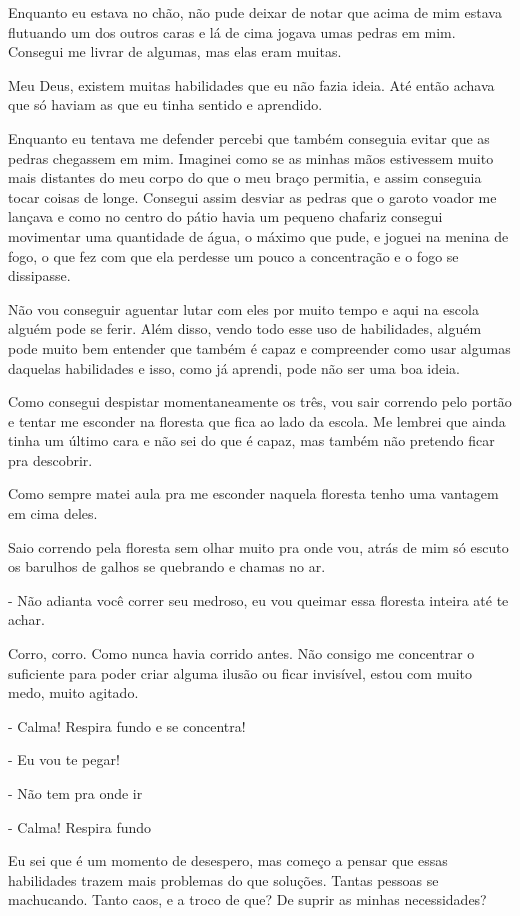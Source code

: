 Enquanto eu estava no chão, não pude deixar de notar que acima de mim estava flutuando um dos outros caras e lá de cima jogava umas pedras em mim. Consegui me livrar de algumas, mas elas eram muitas.

Meu Deus, existem muitas habilidades que eu não fazia ideia. Até então achava que só haviam as que eu tinha sentido e aprendido. 

Enquanto eu tentava me defender percebi que também conseguia evitar que as pedras chegassem em mim. Imaginei como se as minhas mãos estivessem muito mais distantes do meu corpo do que o meu braço permitia, e assim conseguia tocar coisas de longe. Consegui assim desviar as pedras que o garoto voador me lançava e como no centro do pátio havia um pequeno chafariz consegui movimentar uma quantidade de água, o máximo que pude, e joguei na menina de fogo, o que fez com que ela perdesse um pouco a concentração e o fogo se dissipasse.

Não vou conseguir aguentar lutar com eles por muito tempo e aqui na escola alguém pode se ferir. Além disso, vendo todo esse uso de habilidades, alguém pode muito bem entender que também é capaz e compreender como usar algumas daquelas habilidades e isso, como já aprendi, pode não ser uma boa ideia.

Como consegui despistar momentaneamente os três, vou sair correndo pelo portão e tentar me esconder na floresta que fica ao lado da escola. Me lembrei que ainda tinha um último cara e não sei do que é capaz, mas também não pretendo ficar pra descobrir.

Como sempre matei aula pra me esconder naquela floresta tenho uma vantagem em cima deles.

Saio correndo pela floresta sem olhar muito pra onde vou, atrás de mim só escuto os barulhos de galhos se quebrando e chamas no ar.

- Não adianta você correr seu medroso, eu vou queimar essa floresta inteira até te achar.

Corro, corro. Como nunca havia corrido antes. Não consigo me concentrar o suficiente para poder criar alguma ilusão ou ficar invisível, estou com muito medo, muito agitado.

- Calma! Respira fundo e se concentra!

- Eu vou te pegar!

- Não tem pra onde ir

- Calma! Respira fundo

Eu sei que é um momento de desespero, mas começo a pensar que essas habilidades trazem mais problemas do que soluções. Tantas pessoas se machucando. Tanto caos, e a troco de que? De suprir as minhas necessidades?

